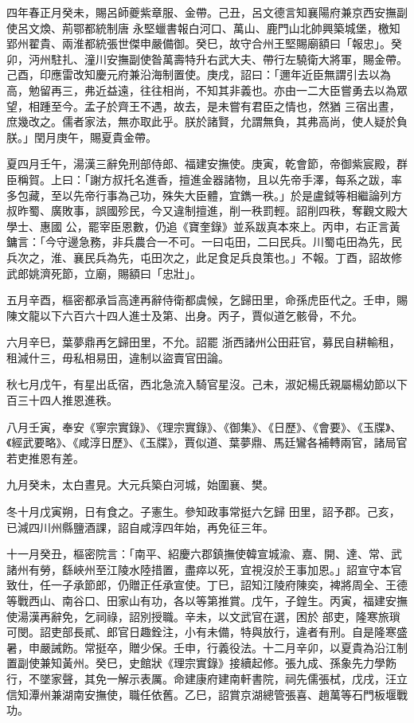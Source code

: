 \begin{pinyinscope}
 四年春正月癸未，賜呂師夔紫章服、金帶。己丑，呂文德言知襄陽府兼京西安撫副使呂文煥、荊鄂都統制唐
 永堅蠟書報白河口、萬山、鹿門山北帥興築城堡，檄知郢州翟貴、兩淮都統張世傑申嚴備御。癸巳，故守合州王堅賜廟額曰「報忠」。癸卯，沔州駐扎、潼川安撫副使昝萬壽特升右武大夫、帶行左驍衛大將軍，賜金帶。己酉，印應雷改知慶元府兼沿海制置使。庚戌，詔曰：「邇年近臣無謂引去以為高，勉留再三，弗近益遠，往往相尚，不知其非義也。亦由一二大臣嘗勇去以為眾望，相踵至今。孟子於齊王不遇，故去，是未嘗有君臣之情也，然猶
 三宿出晝，庶幾改之。儒者家法，無亦取此乎。朕於諸賢，允謂無負，其弗高尚，使人疑於負朕。」閏月庚午，賜夏貴金帶。



 夏四月壬午，湯漢三辭免刑部侍郎、福建安撫使。庚寅，乾會節，帝御紫宸殿，群臣稱賀。上曰：「謝方叔托名進香，擅進金器諸物，且以先帝手澤，每系之跋，率多包藏，至以先帝行事為己功，殊失大臣體，宜鐫一秩。」於是盧鉞等相繼論列方叔昨蜀、廣敗事，誤國殄民，今又違制擅進，削一秩罰輕。詔削四秩，奪觀文殿大學士、惠國
 公，罷宰臣恩數，仍追《寶奎錄》並系跋真本來上。丙申，右正言黃鏞言：「今守邊急務，非兵農合一不可。一曰屯田，二曰民兵。川蜀屯田為先，民兵次之，淮、襄民兵為先，屯田次之，此足食足兵良策也。」不報。丁酉，詔故修武郎姚濟死節，立廟，賜額曰「忠壯」。



 五月辛酉，樞密都承旨高達再辭侍衛都虞候，乞歸田里，命孫虎臣代之。壬申，賜陳文龍以下六百六十四人進士及第、出身。丙子，賈似道乞骸骨，不允。



 六月辛巳，葉夢鼎再乞歸田里，不允。詔罷
 浙西諸州公田莊官，募民自耕輸租，租減什三，毋私相易田，違制以盜賣官田論。



 秋七月戊午，有星出氐宿，西北急流入騎官星沒。己未，淑妃楊氏親屬楊幼節以下百三十四人推恩進秩。



 八月壬寅，奉安《寧宗實錄》、《理宗實錄》、《御集》、《日歷》、《會要》、《玉牒》、《經武要略》、《咸淳日歷》、《玉牒》，賈似道、葉夢鼎、馬廷鸞各補轉兩官，諸局官若吏推恩有差。



 九月癸未，太白晝見。大元兵築白河城，始圍襄、樊。



 冬十月戊寅朔，日有食之。子憲生。參知政事常挺六乞歸
 田里，詔予郡。己亥，已減四川州縣鹽酒課，詔自咸淳四年始，再免征三年。



 十一月癸丑，樞密院言：「南平、紹慶六郡鎮撫使韓宣城渝、嘉、開、達、常、武諸州有勞，繇峽州至江陵水陸措置，盡瘁以死，宜視沒於王事加恩。」詔宣守本官致仕，任一子承節郎，仍贈正任承宣使。丁巳，詔知江陵府陳奕，裨將周全、王德等戰西山、南谷口、田家山有功，各以等第推賞。戊午，子鍠生。丙寅，福建安撫使湯漢再辭免，乞祠祿，詔別授職。辛未，以文武官在選，困於
 部吏，隆寒旅瑣可閔。詔吏部長貳、郎官日趣銓注，小有未備，特與放行，違者有刑。自是隆寒盛暑，申嚴誡飭。常挺卒，贈少保。壬申，行義役法。十二月辛卯，以夏貴為沿江制置副使兼知黃州。癸巳，史館狀《理宗實錄》接續起修。張九成、孫象先力學飭行，不墜家聲，其免一解示表厲。命建康府建南軒書院，祠先儒張栻，戊戌，汪立信知潭州兼湖南安撫使，職任依舊。乙巳，詔賞京湖總管張喜、趙萬等石門板堰戰功。




\end{pinyinscope}
